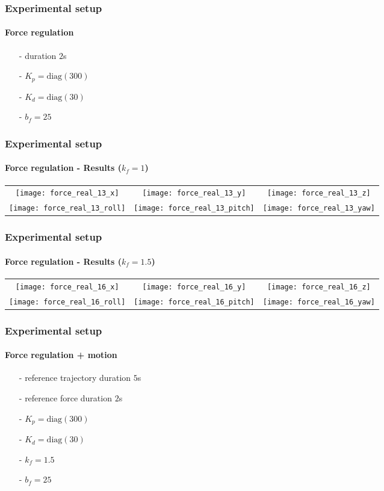 \begin{frame}
  \frametitle{Experimental setup}
  \framesubtitle{Force regulation}
  \begin{itemize}
  \item[-] duration $2$s
  \item[-] $K_p = \mathrm{diag}(300)$
  \item[-] $K_d = \mathrm{diag}(30)$
  \item[-] $b_f = 25$
  \end{itemize}
\end{frame}

\begin{frame}
  \frametitle{Experimental setup}
  \framesubtitle{Force regulation - Results ($k_{f} = 1$)}
  \begin{center}
   \vskip-0.1in
    \begin{tabular}{ccc}
      \texttt{[image: force\_real\_13\_x]} &
      \texttt{[image: force\_real\_13\_y]} &
      \texttt{[image: force\_real\_13\_z]} \\
      \texttt{[image: force\_real\_13\_roll]} &
      \texttt{[image: force\_real\_13\_pitch]} &
      \texttt{[image: force\_real\_13\_yaw]}
    \end{tabular}
  \end{center}
\end{frame}

\begin{frame}
  \frametitle{Experimental setup}
  \framesubtitle{Force regulation - Results ($k_{f} = 1.5$)}
  \begin{center}
   \vskip-0.1in
    \begin{tabular}{ccc}
      \texttt{[image: force\_real\_16\_x]} &
      \texttt{[image: force\_real\_16\_y]} &
      \texttt{[image: force\_real\_16\_z]} \\
      \texttt{[image: force\_real\_16\_roll]} &
      \texttt{[image: force\_real\_16\_pitch]} &
      \texttt{[image: force\_real\_16\_yaw]}
    \end{tabular}
  \end{center}
\end{frame}

\begin{frame}
  \frametitle{Experimental setup}
  \framesubtitle{Force regulation + motion}
  \begin{itemize}
  \item[-] reference trajectory duration $5$s
  \item[-] reference force duration $2$s
  \item[-] $K_p = \mathrm{diag}(300)$
  \item[-] $K_d = \mathrm{diag}(30)$
  \item[-] $k_{f} = 1.5$
  \item[-] $b_f = 25$
  \end{itemize}
\end{frame}

